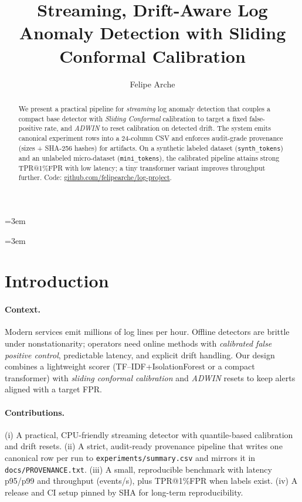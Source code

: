 \documentclass[10pt,twocolumn]{article}
\title{\large Streaming, Drift-Aware Log Anomaly Detection with Sliding Conformal Calibration \\
\small}
\author{Felipe Arche\\\small \texttt{\authoremail}}
\date{}
\date{}
\begin{document}
\emergencystretch=3em

\emergencystretch=3em

\raggedbottom

\maketitle

\begin{abstract}
We present a practical pipeline for \emph{streaming} log anomaly detection that couples a compact base detector with \emph{Sliding Conformal} calibration to target a fixed false-positive rate, and \emph{ADWIN} to reset calibration on detected drift. The system emits canonical experiment rows into a 24-column CSV and enforces audit-grade provenance (sizes + SHA-256 hashes) for artifacts. On a synthetic labeled dataset (\texttt{synth\_tokens}) and an unlabeled micro-dataset (\texttt{mini\_tokens}), the calibrated pipeline attains strong TPR@1\%FPR with low latency; a tiny transformer variant improves throughput further. Code: \href{https://github.com/felipearche/log-project}{github.com/felipearche/log-project}.
\end{abstract}

\section{Introduction}

\paragraph{Context.} Modern services emit millions of log lines per hour. Offline detectors are brittle under nonstationarity; operators need online methods with \emph{calibrated false positive control}, predictable latency, and explicit drift handling. Our design combines a lightweight scorer (TF--IDF{+}IsolationForest or a compact transformer) with \emph{sliding conformal calibration} and \emph{ADWIN} resets to keep alerts aligned with a target FPR.

\paragraph{Contributions.} (i) A practical, CPU-friendly streaming detector with quantile-based calibration and drift resets. (ii) A strict, audit-ready provenance pipeline that writes one canonical row per run to \texttt{experiments/summary.csv} and mirrors it in \texttt{docs/PROVENANCE.txt}. (iii) A small, reproducible benchmark with latency p95/p99 and throughput (events/s), plus TPR@1\%FPR when labels exist. (iv) A release and CI setup pinned by SHA for long-term reproducibility.
\end{document}
